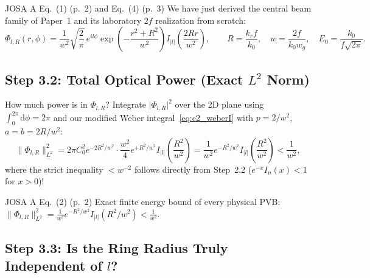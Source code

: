 \documentclass[10pt,letterpaper]{article}
\newcommand{\norm}[1]{\lVert #1 \rVert}
\newcommand{\abs}[1]{\lvert #1 \rvert}
\newcommand{\dd}{\mathrm{d}}
\numberwithin{equation}{section}
\begin{document}
\begin{paperhit}{JOSA A Eq.~(1) (p.~2) and Eq.~(4) (p.~3)}
We have just derived the central beam family of Paper~1 and its laboratory $2f$ realization from scratch:
\[
  \Phi_{l,R}(r,\phi) = \frac{1}{w^2}\sqrt{\frac{2}{\pi}}\,e^{il\phi}\exp\!\left(-\frac{r^2+R^2}{w^2}\right) I_{\abs{l}}\!\left(\frac{2Rr}{w^2}\right), \qquad
  R = \frac{k_r f}{k_0}, \quad w = \frac{2f}{k_0 w_g}, \quad E_0 = \frac{k_0}{f\sqrt{2\pi}}.
\]
\end{paperhit}

\subsection{Step 3.2: Total Optical Power (Exact $L^2$ Norm)}

How much power is in $\Phi_{l,R}$? Integrate $\abs{\Phi_{l,R}}^2$ over the 2D plane using $\int_0^{2\pi}\dd\phi = 2\pi$ and our modified Weber integral~\eqref{eq:c2_weberI} with $p = 2/w^2$, $a = b = 2R/w^2$:
\begin{equation}
  \norm{\Phi_{l,R}}_{L^2}^2 = 2\pi C_0^2 e^{-2R^2/w^2}\cdot\frac{w^2}{4} e^{+R^2/w^2} I_{\abs{l}}\!\left(\frac{R^2}{w^2}\right) = \frac{1}{w^2} e^{-R^2/w^2} I_{\abs{l}}\!\left(\frac{R^2}{w^2}\right) < \frac{1}{w^2},
\end{equation}
where the strict inequality $< w^{-2}$ follows directly from Step~2.2 ($e^{-x} I_n(x) < 1$ for $x > 0$)!

\begin{paperhit}{JOSA A Eq.~(2) (p.~2)}
Exact finite energy bound of every physical PVB: $\norm{\Phi_{l,R}}_{L^2}^2 = \frac{1}{w^2} e^{-R^2/w^2} I_{\abs{l}}(R^2/w^2) < \frac{1}{w^2}$.
\end{paperhit}

\subsection{Step 3.3: Is the Ring Radius Truly Independent of $l$?}
\end{document}
